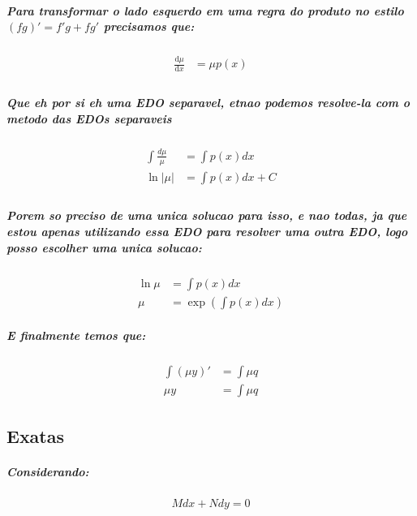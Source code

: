 \documentclass[12pt,twoside, a4paper, twocolumn]{article}
\newcommand\deriv[2]{\frac{\mathrm d #1}{\mathrm d #2}}
\begin{document}
\subparagraph*{Para transformar o lado esquerdo em uma regra do produto no estilo $(fg)' = f' g + fg'$ precisamos que:}

\begin{equation}
    \begin{aligned}
        \deriv{\mu}{x} & = \mu p(x) \\
    \end{aligned}
\end{equation}

\subparagraph*{Que eh por si eh uma EDO separavel, etnao podemos resolve-la com o metodo das EDOs separaveis }

\begin{equation}
    \begin{aligned}
        \int{\frac{d\mu}{\mu}} & = \int{p(x)dx}      \\
        \ln{|\mu|}             & = \int{p(x)dx}  + C \\
    \end{aligned}
\end{equation}

\subparagraph*{Porem so preciso de uma unica solucao para isso, e nao todas, ja que estou apenas utilizando essa EDO para resolver uma outra EDO, logo posso escolher uma unica solucao:}

\begin{equation}
    \begin{aligned}
        \ln{\mu} & = \int{p(x)dx}                    \\
        \mu      & = \exp{\left(\int{p(x)dx}\right)}
    \end{aligned}
\end{equation}

\subparagraph*{E finalmente temos que:}

\begin{equation}
    \begin{aligned}
        \int{(\mu y)'} & = \int{\mu q} \\
        \mu y          & = \int{\mu q}
    \end{aligned}
\end{equation}

\subsection{Exatas}

\subparagraph*{Considerando:}

\begin{equation}
    M dx + N dy = 0
\end{equation}
\end{document}
